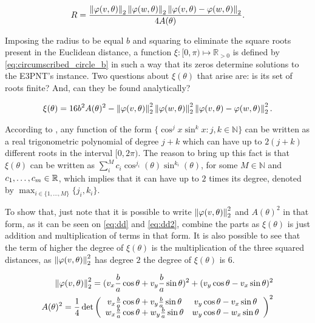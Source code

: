 \begin{equation}\label{eq:circumscribed_circle}
R = \dfrac{\left\lVert\varphi(v, \theta)\right\rVert_{2}\left\lVert\varphi(w, \theta)\right\rVert_{2}\left\lVert\varphi(v, \theta)-\varphi(w, \theta)\right\rVert_{2}   }{4A(\theta)}.
\end{equation}

Imposing the radius to be equal $b$ and squaring to eliminate the square roots present in the Euclidean distance, a function $\xi : [0, \pi) \mapsto \mathbb{R}_{>0}$ is defined by \autoref{eq:circumscribed_circle_b} in such a way that its zeros determine solutions to the E3PNT's instance. Two questions about $\xi(\theta)$ that arise are: is its set of roots finite? And, can they be found analytically?

\begin{equation}\label{eq:circumscribed_circle_b}
\xi(\theta) = 16b^2A(\theta)^2 - \left\lVert\varphi(v, \theta)\right\rVert_{2}^2\left\lVert\varphi(w, \theta)\right\rVert_{2}^2\left\lVert\varphi(v, \theta)-\varphi(w, \theta)\right\rVert_{2}^2.
\end{equation}

According to , any function of the form $\{\cos^j{x}\sin^k{x} : j, k \in \mathbb{N}\}$ can be written as a real trigonometric polynomial of degree $j+k$ which can have up to $2(j+k)$ different roots in the interval $[0, 2\pi)$. The reason to bring up this fact is that $\xi(\theta)$ can be written as $\sum_i^M c_i \cos^{j_i}(\theta)\sin^{k_i}(\theta)$, for some $M \in \mathbb{N}$ and $c_1, \dots, c_m \in \mathbb{R}$, which implies that it can have up to $2$ times its degree, denoted by $\max_{i\in \{1, \dots, M\}} \{j_i, k_i\}$.

 To show that, just note that it is possible to write $\left\lVert\varphi(v, \theta)\right\rVert_{2}^2$ and $A(\theta)^2$ in that form, as it can be seen on \autoref{eq:dd} and \autoref{eq:dd2}, combine the parts as $\xi(\theta)$ is just addition and multiplication of terms in that form. It is also possible to see that the term of higher the degree of $\xi(\theta)$ is the multiplication of the three squared distances, as $\left\lVert\varphi(v, \theta)\right\rVert_{2}^2$ has degree $2$ the degree of $\xi(\theta)$ is $6$.


\begin{align}\label{eq:dd}
	\left\lVert\varphi(v, \theta)\right\rVert_{2}^2 = (v_x\frac{b}{a}\cos\theta + v_y\frac{b}{a}\sin\theta)^2 + (v_y\cos\theta - v_x\sin\theta)^2\\
	\label{eq:dd2} A(\theta)^2=\dfrac{1}{4}\det\left(
	\begin{array}{cc}
		v_x\frac{b}{a}\cos\theta + v_y\frac{b}{a}\sin\theta&v_y\cos\theta - v_x\sin\theta\\
		w_x\frac{b}{a}\cos\theta + w_y\frac{b}{a}\sin\theta&w_y\cos\theta - w_x\sin\theta
	\end{array}\right)^2
\end{align}

